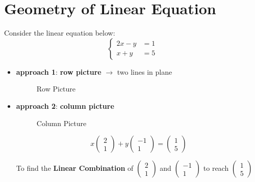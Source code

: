 \vspace{1em}

\section{Geometry of Linear Equation}

\begin{eg}
Consider the linear equation below:
    \[
    \begin{cases}
        2x-y&=1\\
        x+ y&=5
    \end{cases}
    \]
\end{eg}

\begin{itemize}
    \item \textbf{approach 1}: \textbf{row picture} $\rightarrow$ two lines in plane

    \begin{figure}[H]
        \centering
        \caption{Row Picture}
        \label{fig:1.2.1}
    \end{figure}

    \item \textbf{approach 2}: \textbf{column picture}
    \begin{figure}[H]
        \centering
        \caption{Column Picture}
        \label{fig:1.2.2}
    \end{figure}

    \begin{lemma}
    \[
    x
    \left(
    \begin{matrix}
    2 \\
    1
    \end{matrix}\right)
    +y
    \left(\begin{matrix}
    -1 \\
    1
    \end{matrix}\right)
    = 
    \left(\begin{matrix}
    1 \\
    5
    \end{matrix}\right)
    \]
    \end{lemma}

    \vspace{1.2em}
    
    To find the \textbf{Linear Combination} of  \(\left(
    \begin{matrix}
    2 \\
    1 
    \end{matrix}\right)\) and \(\left(
    \begin{matrix}
    -1 \\
    1 
    \end{matrix}\right)\) to reach \(\left(
    \begin{matrix}
    1 \\
    5 
    \end{matrix}\right)\)


\end{itemize}

